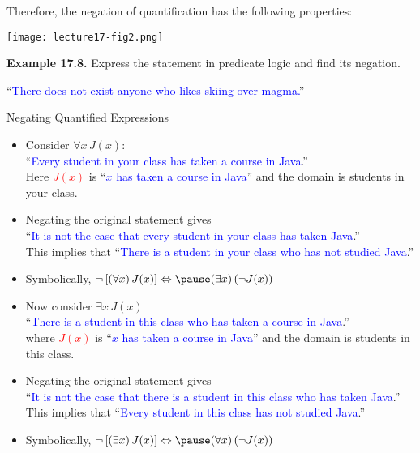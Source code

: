 \documentclass[aspectratio=169]{beamer}
\providecommand{\Blue}[1]{\textcolor{blue}{#1}}
\providecommand{\Red}[1]{\textcolor{red}{#1}}
\begin{document}
\begin{frame}[plain]{}

Therefore, the negation of quantification has the following properties:

 \begin{center}
   \texttt{[image: lecture17-fig2.png]}
 \end{center}
 
 {\bf Example 17.8.} Express the statement in predicate logic and find its negation.
      \begin{center}
         ``\Blue{There does not exist anyone who likes skiing over magma.}''   
      \end{center}

\end{frame}

\iffalse%
\begin{frame}[plain]{Negating Quantified Expressions}
  
  \begin{itemize}
   \item Consider $\forall x\, J(x)$:\\
     ``\Blue{Every student in your class has taken a course in Java}.''\\
      Here \Red{$J(x)$} is ``\Blue{$x$ has taken a course in Java}'' and
      the domain is students in your class.
    \item  Negating the original statement gives \pause \\
     ``\Blue{It is not the case that every student in your class has taken Java}.''\\
    This implies that ``\Blue{There is a student in your class who
has not studied Java}.''
    \item Symbolically, 
    \Blue{$\neg\left[ (\forall x)\, J(x)\right]  \Leftrightarrow \pause (\exists x)\, (\neg J(x))$ }
 \end{itemize}
\end{frame}

\begin{frame}[plain]{}
  
  \begin{itemize}
   \item Now consider $\exists x\, J(x)$\\
     ``\Blue{There is a student in this class who has taken a course in Java}.''\\
      where \Red{$J(x)$} is ``\Blue{$x$ has taken a course in Java}'' and
      the domain is students in this class.
    \item  Negating the original statement gives  \pause \\
     ``\Blue{It is not the case that there is a student in this class who has taken Java}.''\\
    This implies that ``\Blue{Every student in this class has not studied Java}.''
    \item Symbolically, \Blue{$\neg\left[ (\exists x)\, J(x)\right] \Leftrightarrow \pause 
      (\forall x)\, (\neg J(x))$} 
 \end{itemize}
\end{frame}
\end{document}
